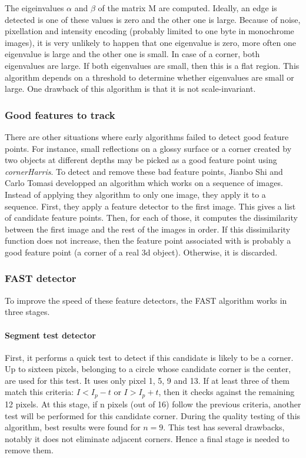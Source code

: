 \documentclass[12pt]{article}
\begin{document}
The eigeinvalues $\alpha$ and $\beta$ of the matrix M are computed. Ideally, an edge is detected is one of these values is zero and the other one is large. Because of noise, pixellation and intensity encoding (probably limited to one byte in monochrome images), it is very unlikely to happen that one eigenvalue is zero, more often one eigenvalue is large and the other one is small. In case of a corner, both eigenvalues are large. If both eigenvalues are small, then this is a flat region. This algorithm depends on a threshold to determine whether eigenvalues are small or large. One drawback of this algorithm is that it is not scale-invariant.
\subsubsection{Good features to track}
There are other situations where early algorithms failed to detect good feature points. For instance, small reflections on a glossy surface or a corner created by two objects at different depths may be picked as a good feature point using \textit{cornerHarris}. To detect and remove these bad feature points, Jianbo Shi and Carlo Tomasi developped an algorithm\cite{Shi94} which works on a sequence of images. Instead of applying they algorithm to only one image, they apply it to a sequence. First, they apply a feature detector to the first image. This gives a list of candidate feature points. Then, for each of those, it computes the dissimilarity between the first image and the rest of the images in order. If this dissimilarity function does not increase, then the feature point associated with is probably a good feature point (a corner of a real 3d object). Otherwise, it is discarded.

\subsubsection{FAST detector}

To improve the speed of these feature detectors, the FAST\cite{Fast06} algorithm works in three stages. 

\paragraph{Segment test detector}
First, it performs a quick test to detect if this candidate is likely to be a corner. Up to sixteen pixels, belonging to a circle whose candidate corner is the center, are used for this test. It uses only pixel 1, 5, 9 and 13. If at least three of them match this criteria: $I < I_p - t$ or $I > I_p + t$, then it checks against the remaining 12 pixels. At this stage, if n pixels (out of 16) follow the previous criteria, another test will be performed for this candidate corner. During the quality testing of this algorithm, best results were found for $n = 9$. This test has several drawbacks, notably it does not eliminate adjacent corners. Hence a final stage is needed to remove them.
\end{document}
